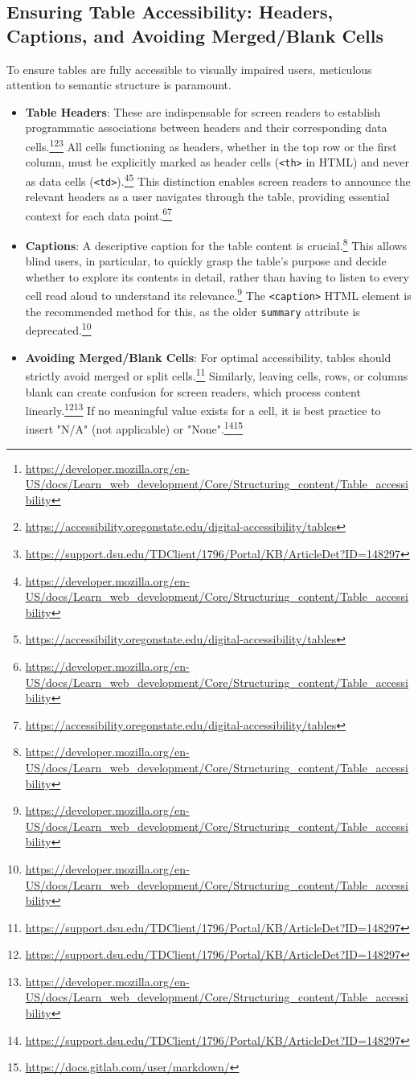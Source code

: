 \subsection{Ensuring Table Accessibility: Headers, Captions, and Avoiding Merged/Blank Cells}
To ensure tables are fully accessible to visually impaired users, meticulous attention to semantic structure is paramount.
\begin{itemize}[noitemsep,topsep=0pt]
    \item \textbf{Table Headers}: These are indispensable for screen readers to establish programmatic associations between headers and their corresponding data cells.\footnote{\url{https://developer.mozilla.org/en-US/docs/Learn_web_development/Core/Structuring_content/Table_accessibility}}\footnote{\url{https://accessibility.oregonstate.edu/digital-accessibility/tables}}\footnote{\url{https://support.dsu.edu/TDClient/1796/Portal/KB/ArticleDet?ID=148297}} All cells functioning as headers, whether in the top row or the first column, must be explicitly marked as header cells (\texttt{<th>} in HTML) and never as data cells (\texttt{<td>}).\footnote{\url{https://developer.mozilla.org/en-US/docs/Learn_web_development/Core/Structuring_content/Table_accessibility}}\footnote{\url{https://accessibility.oregonstate.edu/digital-accessibility/tables}} This distinction enables screen readers to announce the relevant headers as a user navigates through the table, providing essential context for each data point.\footnote{\url{https://developer.mozilla.org/en-US/docs/Learn_web_development/Core/Structuring_content/Table_accessibility}}\footnote{\url{https://accessibility.oregonstate.edu/digital-accessibility/tables}}
    \item \textbf{Captions}: A descriptive caption for the table content is crucial.\footnote{\url{https://developer.mozilla.org/en-US/docs/Learn_web_development/Core/Structuring_content/Table_accessibility}} This allows blind users, in particular, to quickly grasp the table's purpose and decide whether to explore its contents in detail, rather than having to listen to every cell read aloud to understand its relevance.\footnote{\url{https://developer.mozilla.org/en-US/docs/Learn_web_development/Core/Structuring_content/Table_accessibility}} The \texttt{<caption>} HTML element is the recommended method for this, as the older \texttt{summary} attribute is deprecated.\footnote{\url{https://developer.mozilla.org/en-US/docs/Learn_web_development/Core/Structuring_content/Table_accessibility}}
    \item \textbf{Avoiding Merged/Blank Cells}: For optimal accessibility, tables should strictly avoid merged or split cells.\footnote{\url{https://support.dsu.edu/TDClient/1796/Portal/KB/ArticleDet?ID=148297}} Similarly, leaving cells, rows, or columns blank can create confusion for screen readers, which process content linearly.\footnote{\url{https://support.dsu.edu/TDClient/1796/Portal/KB/ArticleDet?ID=148297}}\footnote{\url{https://developer.mozilla.org/en-US/docs/Learn_web_development/Core/Structuring_content/Table_accessibility}} If no meaningful value exists for a cell, it is best practice to insert "N/A" (not applicable) or "None".\footnote{\url{https://support.dsu.edu/TDClient/1796/Portal/KB/ArticleDet?ID=148297}}\footnote{\url{https://docs.gitlab.com/user/markdown/}}

\end{itemize}
